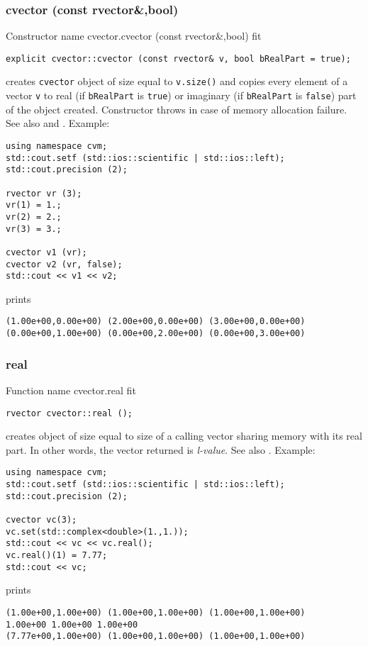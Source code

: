 \subsubsection{cvector (const rvector\&,bool)}
Constructor%
\pdfdest name {cvector.cvector (const rvector&,bool)} fit
\begin{verbatim}
explicit cvector::cvector (const rvector& v, bool bRealPart = true);
\end{verbatim}
creates  \verb"cvector" object
of size equal to \verb"v.size()" and copies every
element of a vector \verb"v"
to  real (if \verb"bRealPart" is \verb"true")
or imaginary (if \verb"bRealPart" is \verb"false")
part of the object created.
Constructor throws  
in case of memory allocation failure.
See also  and .
Example:
\begin{Verbatim}
using namespace cvm;
std::cout.setf (std::ios::scientific | std::ios::left);
std::cout.precision (2);

rvector vr (3);
vr(1) = 1.;
vr(2) = 2.;
vr(3) = 3.;

cvector v1 (vr);
cvector v2 (vr, false);
std::cout << v1 << v2;
\end{Verbatim}
prints
\begin{Verbatim}
(1.00e+00,0.00e+00) (2.00e+00,0.00e+00) (3.00e+00,0.00e+00)
(0.00e+00,1.00e+00) (0.00e+00,2.00e+00) (0.00e+00,3.00e+00)
\end{Verbatim}
\newpage


\subsubsection{real}
Function%
\pdfdest name {cvector.real} fit
\begin{verbatim}
rvector cvector::real ();
\end{verbatim}
creates   object
of size equal to  size of a calling vector
sharing  memory with its real part.
In other words, the vector returned is  \emph{l-value}.
See also .
Example:
\begin{Verbatim}
using namespace cvm;
std::cout.setf (std::ios::scientific | std::ios::left);
std::cout.precision (2);

cvector vc(3);
vc.set(std::complex<double>(1.,1.));
std::cout << vc << vc.real();
vc.real()(1) = 7.77;
std::cout << vc;
\end{Verbatim}
prints
\begin{Verbatim}
(1.00e+00,1.00e+00) (1.00e+00,1.00e+00) (1.00e+00,1.00e+00)
1.00e+00 1.00e+00 1.00e+00
(7.77e+00,1.00e+00) (1.00e+00,1.00e+00) (1.00e+00,1.00e+00)
\end{Verbatim}
\newpage



